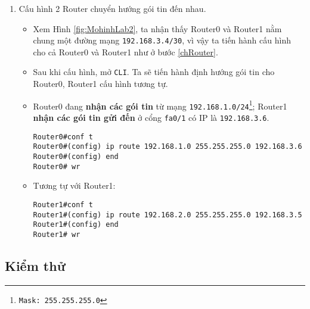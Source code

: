 \documentclass[]{article}
\begin{document}
\begin{enumerate}
\begin{itemize}
\begin{lstlisting}
Router0#(config-if) network 192.168.1.0 255.255.255.0
\end{lstlisting}
\item Sau đó, đặt Router mặc định cho mạng \texttt{192.168.1.0/24}:
\begin{lstlisting}
Router0#(config-if) default-router 192.168.1.1
\end{lstlisting}
\item Cuối cùng, đặt trạng thái cho cổng \texttt{fa0/0} luôn mở và ghi lại các thay đổi của Router.
\begin{lstlisting}
Router0#(config-if) no shutdown
Router0#(config-if) end
Router0# wr
\end{lstlisting}
\end{itemize}
Kết thúc bước này, các máy tính trong mạng \texttt{192.168.1.0/24} đã có thể \texttt{ping} cho nhau.
\begin{figure}[H]
    \centering
    \texttt{[image: lab2/Lab02-hinh3.png]}
    \caption{PC0 đã ping thành công cho PC1}
\end{figure}
\item Cấu hình 2 Router chuyển hướng gói tin đến nhau.\label{chRouting}
\begin{itemize}
\item Xem Hình \ref{fig:MohinhLab2}, ta nhận thấy Router0 và Router1 nằm chung một đường mạng \texttt{192.168.3.4/30}, vì vậy ta tiến hành cấu hình cho cả Router0 và Router1 như ở bước \ref{chRouter}.
\item Sau khi cấu hình, mở \texttt{CLI}. Ta sẽ tiến hành định hướng gói tin cho Router0, Router1 cấu hình tương tự.
\item Router0 đang \textbf{nhận các gói tin} từ mạng \texttt{192.168.1.0/24\footnote{Mask: 255.255.255.0}}; Router1 \textbf{nhận các gói tin gửi đến} ở cổng \texttt{fa0/1} có IP là \texttt{192.168.3.6}.
\begin{lstlisting}
Router0#conf t
Router0#(config) ip route 192.168.1.0 255.255.255.0 192.168.3.6
Router0#(config) end
Router0# wr
\end{lstlisting}
\item Tương tự với Router1:
\begin{lstlisting}
Router1#conf t
Router1#(config) ip route 192.168.2.0 255.255.255.0 192.168.3.5
Router1#(config) end
Router1# wr
\end{lstlisting}
\end{itemize}
\end{enumerate}
\subsection{Kiểm thử}
\end{document}
